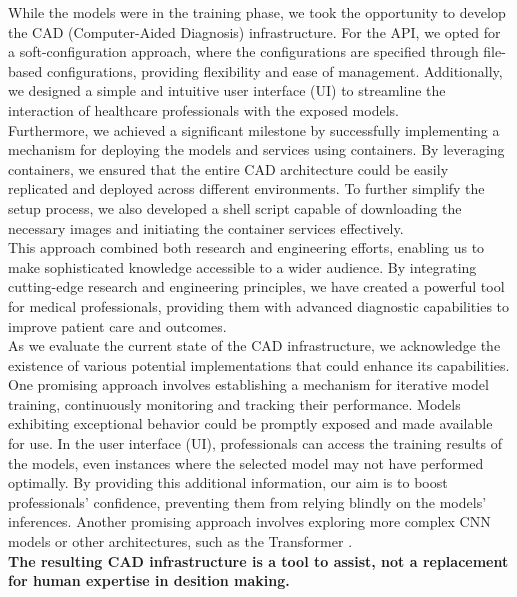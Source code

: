 While the models were in the training phase, we took the opportunity to develop
the CAD (Computer-Aided Diagnosis) infrastructure. For the API, we opted for a
soft-configuration approach, where the configurations are specified through
file-based configurations, providing flexibility and ease of management.
Additionally, we designed a simple and intuitive user interface (UI) to
streamline the interaction of healthcare professionals with the exposed models.
\\

Furthermore, we achieved a significant milestone by successfully implementing a
mechanism for deploying the models and services using containers. By leveraging
containers, we ensured that the entire CAD architecture could be easily
replicated and deployed across different environments. To further simplify the
setup process, we also developed a shell script capable of downloading the
necessary images and initiating the container services effectively. \\

This approach combined both research and engineering efforts, enabling us to
make sophisticated knowledge accessible to a wider audience. By integrating
cutting-edge research and engineering principles, we have created a powerful
tool for medical professionals, providing them with advanced diagnostic
capabilities to improve patient care and outcomes. \\

As we evaluate the current state of the CAD infrastructure, we acknowledge the
existence of various potential implementations that could enhance its
capabilities. One promising approach involves establishing a mechanism for
iterative model training, continuously monitoring and tracking their
performance. Models exhibiting exceptional behavior could be promptly exposed
and made available for use. In the user interface (UI), professionals can
access the training results of the models, even instances where the selected
model may not have performed optimally. By providing this additional
information, our aim is to boost professionals' confidence, preventing them
from relying blindly on the models' inferences. Another promising approach
involves exploring more complex CNN models or other architectures, such as the
Transformer \cite{Transformer}. \\

{\bf The resulting CAD infrastructure is a tool to assist, not a replacement for
human expertise in desition making.}
